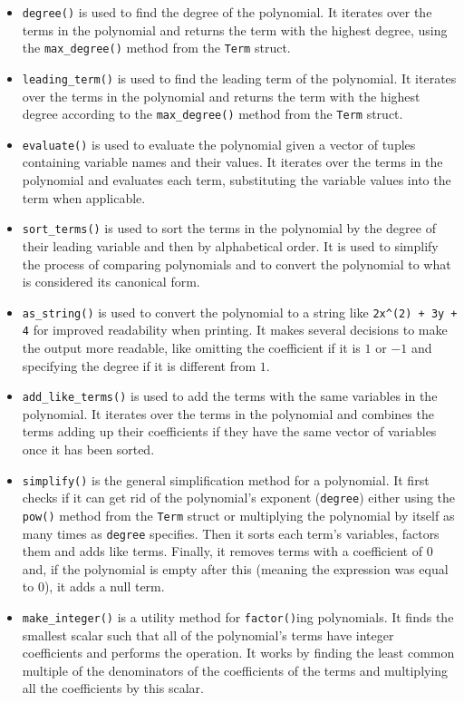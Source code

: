 \begin{itemize}
    \item \verb|degree()| is used to find the degree of the polynomial. It iterates over the terms in the polynomial and returns the term with the highest degree, using the \verb|max_degree()| method from the \texttt{Term} struct.
    \item \verb|leading_term()| is used to find the leading term of the polynomial. It iterates over the terms in the polynomial and returns the term with the highest degree according to the \verb|max_degree()| method from the \texttt{Term} struct.
    \item \verb|evaluate()| is used to evaluate the polynomial given a vector of tuples containing variable names and their values. It iterates over the terms in the polynomial and evaluates each term, substituting the variable values into the term when applicable.
    \item \verb|sort_terms()| is used to sort the terms in the polynomial by the degree of their leading variable and then by alphabetical order. It is used to simplify the process of comparing polynomials and to convert the polynomial to what is considered its canonical form.
    \item \verb|as_string()| is used to convert the polynomial to a string like \verb|2x^(2) + 3y + 4| for improved readability when printing. It makes several decisions to make the output more readable, like omitting the coefficient if it is $1$ or $-1$ and specifying the degree if it is different from $1$.
    \item \verb|add_like_terms()| is used to add the terms with the same variables in the polynomial. It iterates over the terms in the polynomial and combines the terms adding up their coefficients if they have the same vector of variables once it has been sorted.
    \item \verb|simplify()| is the general simplification method for a polynomial. It first checks if it can get rid of the polynomial's exponent (\verb|degree|) either using the \verb|pow()| method from the \texttt{Term} struct or multiplying the polynomial by itself as many times as \verb|degree| specifies. Then it sorts each term's variables, factors them and adds like terms. Finally, it removes terms with a coefficient of $0$ and, if the polynomial is empty after this (meaning the expression was equal to $0$), it adds a null term.
    \item \verb|make_integer()| is a utility method for \verb|factor()|ing polynomials. It finds the smallest scalar such that all of the polynomial's terms have integer coefficients and performs the operation. It works by finding the least common multiple of the denominators of the coefficients of the terms and multiplying all the coefficients by this scalar. 

\end{itemize}
